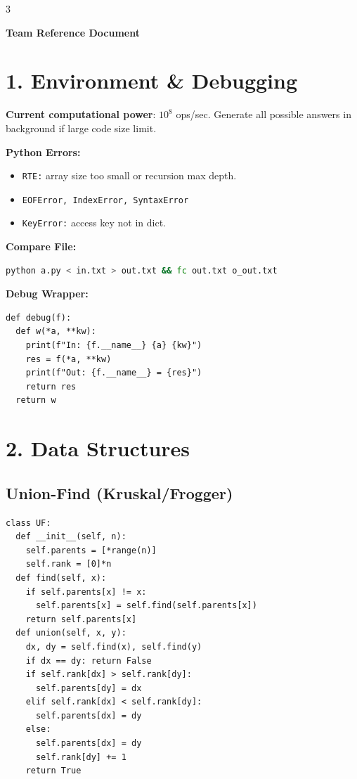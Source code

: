 \documentclass[8pt,a4paper,landscape]{extarticle}
\begin{document}
\begin{multicols*}{3}
\raggedright

\begin{center}
    \Large\textbf{Team Reference Document}
\end{center}

\section*{1. Environment \& Debugging}
\textbf{Current computational power}: $10^8$ ops/sec. Generate all possible answers in background if large code size limit.

\textbf{Python Errors:}
\begin{itemize}[leftmargin=*,noitemsep,topsep=0pt]
\item \texttt{RTE:} array size too small or recursion max depth.
\item \texttt{EOFError, IndexError, SyntaxError}
\item \texttt{KeyError:} access key not in dict.
\end{itemize}

\textbf{Compare File:}
\begin{lstlisting}[language=bash]
python a.py < in.txt > out.txt && fc out.txt o_out.txt
\end{lstlisting}

\textbf{Debug Wrapper:}
\begin{lstlisting}
def debug(f):
  def w(*a, **kw):
    print(f"In: {f.__name__} {a} {kw}")
    res = f(*a, **kw)
    print(f"Out: {f.__name__} = {res}")
    return res
  return w
\end{lstlisting}

\section*{2. Data Structures}
\subsection*{Union-Find (Kruskal/Frogger)}
\begin{lstlisting}
class UF:
  def __init__(self, n):
    self.parents = [*range(n)]
    self.rank = [0]*n
  def find(self, x):
    if self.parents[x] != x:
      self.parents[x] = self.find(self.parents[x])
    return self.parents[x]
  def union(self, x, y):
    dx, dy = self.find(x), self.find(y)
    if dx == dy: return False
    if self.rank[dx] > self.rank[dy]:
      self.parents[dy] = dx
    elif self.rank[dx] < self.rank[dy]:
      self.parents[dx] = dy
    else:
      self.parents[dx] = dy
      self.rank[dy] += 1
    return True
\end{lstlisting}


\end{multicols*}
\end{document}
